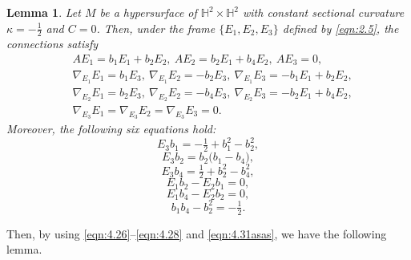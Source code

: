 \documentclass[reqno]{amsart}%
\newtheorem{lemma}[theorem]{Lemma}
\theoremstyle{definition}
\numberwithin{equation}{section}
\begin{document}
\begin{lemma}\label{lemma:4.7}
Let $M$ be a hypersurface of $\mathbb{H}^2\times \mathbb{H}^2$ with constant sectional curvature $\kappa=-\frac{1}{2}$ and $C=0$.
Then, under the frame $\{E_1,E_2,E_3\}$ defined by \eqref{eqn:2.5},
the connections satisfy
\begin{equation}\label{eqn:2.25a11}
\begin{aligned}
&A E_1=b_1 E_1+b_2 E_2,\ A E_2=b_2 E_1+b_4 E_2,\ A E_3=0,\\		
&\nabla_{E_1}E_1=b_1E_3,\
\nabla_{E_1}E_2=-b_2E_3,\ \nabla_{E_1}E_3=-b_1E_1
+b_2E_2,\\
&\nabla_{E_2} E_1=b_2E_3,\
\nabla_{E_2} E_2=-b_4E_3,\ \nabla_{E_2}E_3=-b_2E_1
+b_4E_2,\\
&\nabla_{E_3}E_1=\nabla_{E_3}E_2=\nabla_{E_3}E_3=0.
\end{aligned}
\end{equation}
Moreover, the following six equations hold:
\begin{equation}\label{eqn:4.26}
E_3b_1=-\tfrac{1}{2}+b_1^{2}-b_2^2,
\end{equation}
%
\begin{equation}\label{eqn:4.27}
E_3b_2=b_2\big(b_1-b_4\big),
\end{equation}
%
\begin{equation}\label{eqn:4.28}
E_3b_4=\tfrac{1}{2}+b_2^{2}-b_4^2,
\end{equation}
%
\begin{equation}\label{eqn:4.29}
E_1b_2-E_2b_1=0,	
\end{equation}
%
\begin{equation}\label{eqn:4.30}
E_1b_4-E_2b_2=0,
\end{equation}
%
\begin{equation}\label{eqn:4.31asas}
b_1b_4-b_2^2=-\tfrac{1}{2}.
\end{equation}
\end{lemma}

Then, by using \eqref{eqn:4.26}--\eqref{eqn:4.28} and \eqref{eqn:4.31asas},
we have the following lemma.
\end{document}

